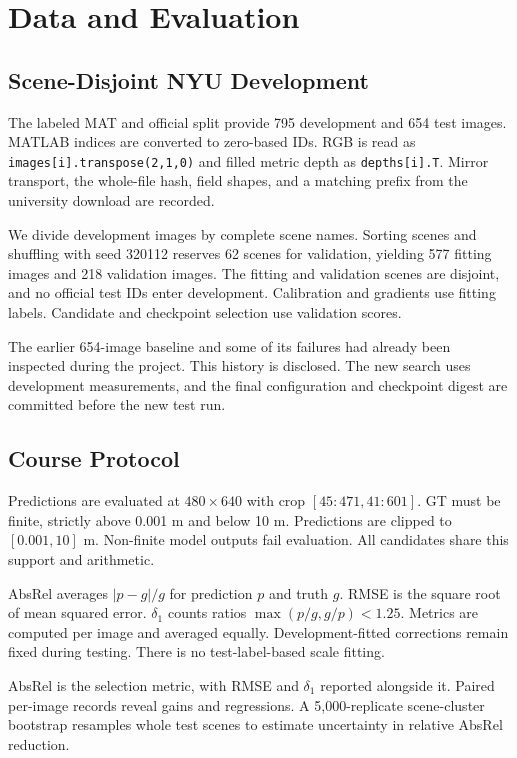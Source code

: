 \documentclass[10pt,twocolumn,letterpaper]{article}
\begin{document}
\section{Data and Evaluation}
\subsection{Scene-Disjoint NYU Development}
The labeled MAT and official split provide 795 development and 654 test images. MATLAB indices are converted to zero-based IDs. RGB is read as \texttt{images[i].transpose(2,1,0)} and filled metric depth as \texttt{depths[i].T}. Mirror transport, the whole-file hash, field shapes, and a matching prefix from the university download are recorded.

We divide development images by complete scene names. Sorting scenes and shuffling with seed 320112 reserves 62 scenes for validation, yielding 577 fitting images and 218 validation images. The fitting and validation scenes are disjoint, and no official test IDs enter development. Calibration and gradients use fitting labels. Candidate and checkpoint selection use validation scores.

The earlier 654-image baseline and some of its failures had already been inspected during the project. This history is disclosed. The new search uses development measurements, and the final configuration and checkpoint digest are committed before the new test run.

\subsection{Course Protocol}
Predictions are evaluated at $480\times640$ with crop $[45:471,41:601]$. GT must be finite, strictly above 0.001 m and below 10 m. Predictions are clipped to $[0.001,10]$ m. Non-finite model outputs fail evaluation. All candidates share this support and arithmetic.

AbsRel averages $|p-g|/g$ for prediction $p$ and truth $g$. RMSE is the square root of mean squared error. $\delta_1$ counts ratios $\max(p/g,g/p)<1.25$. Metrics are computed per image and averaged equally. Development-fitted corrections remain fixed during testing. There is no test-label-based scale fitting.

AbsRel is the selection metric, with RMSE and $\delta_1$ reported alongside it. Paired per-image records reveal gains and regressions. A 5,000-replicate scene-cluster bootstrap resamples whole test scenes to estimate uncertainty in relative AbsRel reduction.
\end{document}
